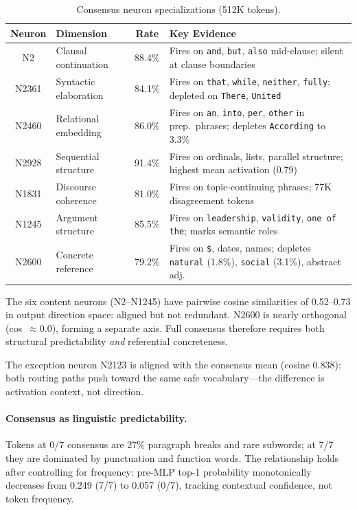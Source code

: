 \documentclass{article}
\begin{document}
\begin{table}[h]
\centering
\caption{Consensus neuron specializations (512K tokens).}
\label{tab:consensus_full}
\begin{tabular}{@{}clcp{5cm}@{}}
\toprule
Neuron & Dimension & Rate & Key Evidence \\
\midrule
N2     & Clausal continuation   & 88.4\% & Fires on \texttt{and}, \texttt{but}, \texttt{also} mid-clause; silent at clause boundaries \\
N2361  & Syntactic elaboration  & 84.1\% & Fires on \texttt{that}, \texttt{while}, \texttt{neither}, \texttt{fully}; depleted on \texttt{There}, \texttt{United} \\
N2460  & Relational embedding   & 86.0\% & Fires on \texttt{an}, \texttt{into}, \texttt{per}, \texttt{other} in prep.\ phrases; depletes \texttt{According} to 3.3\% \\
N2928  & Sequential structure   & 91.4\% & Fires on ordinals, lists, parallel structure; highest mean activation (0.79) \\
N1831  & Discourse coherence    & 81.0\% & Fires on topic-continuing phrases; 77K disagreement tokens \\
N1245  & Argument structure     & 85.5\% & Fires on \texttt{leadership}, \texttt{validity}, \texttt{one of the}; marks semantic roles \\
\midrule
N2600  & Concrete reference     & 79.2\% & Fires on \texttt{\$}, dates, names; depletes \texttt{natural} (1.8\%), \texttt{social} (3.1\%), abstract adj. \\
\bottomrule
\end{tabular}
\end{table}

The six content neurons (N2--N1245) have pairwise cosine similarities of
0.52--0.73 in output direction space: aligned but not redundant.
N2600 is nearly orthogonal (cos~$\approx 0.0$), forming a separate axis.
Full consensus therefore requires both structural predictability \emph{and}
referential concreteness.

The exception neuron N2123 is aligned with the consensus mean (cosine 0.838):
both routing paths push toward the same safe vocabulary---the difference is
activation context, not direction.

\paragraph{Consensus as linguistic predictability.}
Tokens at 0/7 consensus are 27\% paragraph breaks and rare subwords;
at 7/7 they are dominated by punctuation and function words.
The relationship holds after controlling for frequency: pre-MLP top-1
probability monotonically decreases from 0.249 (7/7) to 0.057 (0/7),
tracking contextual confidence, not token frequency.
\end{document}
